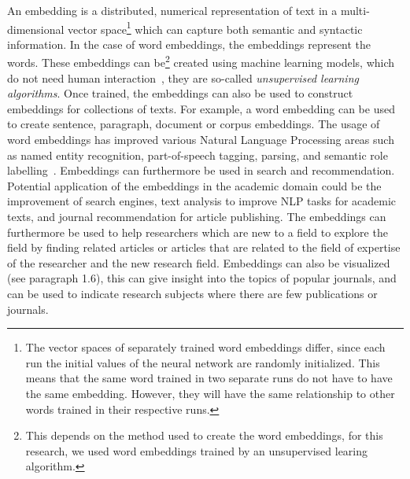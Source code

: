 \documentclass[../../Thesis.tex]{subfiles}
\begin{document}
An embedding is a distributed, numerical representation of text in a multi-dimensional vector space\footnote{The vector spaces of separately trained word embeddings differ, since each run the initial values of the neural network are randomly initialized. This means that the same word trained in two separate runs do not have to have the same embedding. However, they will have the same relationship to other words trained in their respective runs.} which can capture both semantic and syntactic information\cite{mikolov2013distributed}. In the case of word embeddings, the embeddings represent the words. These embeddings can be\footnote{This depends on the method used to create the word embeddings, for this research, we used word embeddings trained by an unsupervised learing algorithm.} created using machine learning models, which do not need human interaction~\cite{lai2016generate}, they are so-called \textit{unsupervised learning algorithms}. Once trained, the embeddings can also be used to construct embeddings for collections of texts. For example, a word embedding can be used to create sentence, paragraph, document or corpus embeddings. The usage of word embeddings has improved various Natural Language Processing areas such as named entity recognition, part-of-speech tagging, parsing, and semantic role labelling~\cite{luong2013better}. Embeddings can furthermore be used in search and recommendation. Potential application of the embeddings in the academic domain could be the improvement of search engines, text analysis to improve NLP tasks for academic texts, and journal recommendation for article publishing. The embeddings can furthermore be used to help researchers which are new to a field to explore the field by finding related articles or articles that are related to the field of expertise of the researcher and the new research field. Embeddings can also be visualized (see paragraph 1.6), this can give insight into the topics of popular journals, and can be used to indicate research subjects where there are few publications or journals.
\end{document}
